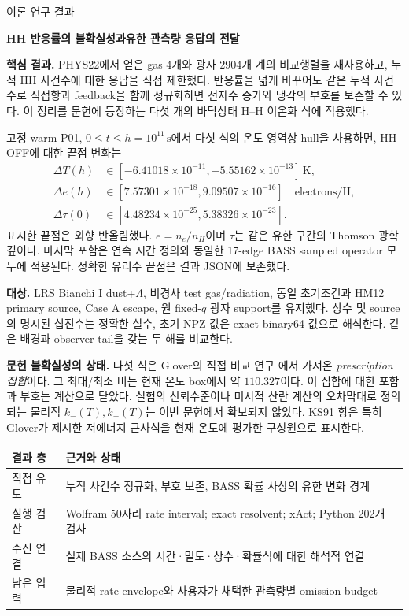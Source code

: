 \documentclass[11pt,a4paper]{article}
\begin{document}
{\large\sffamily\color{ink} 이론 연구 결과}\par
{\LARGE\bfseries HH 반응률의 불확실성과\newline 유한 관측량 응답의 전달}\par
\vspace{3mm}
\textbf{핵심 결과.} PHYS22에서 얻은 gas 4개와 광자 2904개 계의 비교행렬을 재사용하고, 누적 HH 사건수에 대한 응답을 직접 제한했다. 반응률을 넓게 바꾸어도 같은 누적 사건수로 직접항과 feedback을 함께 정규화하면 전자수 증가와 냉각의 부호를 보존할 수 있다. 이 정리를 문헌에 등장하는 다섯 개의 바닥상태 H--H 이온화 식에 적용했다.

고정 warm P01, $0\le t\le h=10^{11}\,\mathrm s$에서 다섯 식의 온도 영역상 hull을 사용하면, HH-OFF에 대한 끝점 변화는
\begin{align}
\Delta T(h)&\in[-6.41018\times10^{-11},-5.55162\times10^{-13}]\,\mathrm K,\\
\Delta e(h)&\in[7.57301\times10^{-18},9.09507\times10^{-16}]\quad\text{electrons/H},\\
\Delta\tau(0)&\in[4.48234\times10^{-25},5.38326\times10^{-23}].
\end{align}
표시한 끝점은 외향 반올림했다. $e=n_e/n_H$이며 $\tau$는 같은 유한 구간의 Thomson 광학깊이다. 마지막 포함은 연속 시간 정의와 동일한 17-edge BASS sampled operator 모두에 적용된다. 정확한 유리수 끝점은 결과 JSON에 보존했다.

\textbf{대상.} LRS Bianchi I dust+$\Lambda$, 비경사 test gas/radiation, 동일 초기조건과 HM12 primary source, Case A escape, 원 fixed-$q$ 광자 support를 유지했다. 상수 및 source의 명시된 십진수는 정확한 실수, 초기 NPZ 값은 exact binary64 값으로 해석한다. 같은 배경과 observer tail을 갖는 두 해를 비교한다.

\textbf{문헌 불확실성의 상태.} 다섯 식은 Glover의 직접 비교 연구 \cite{glover}에서 가져온 \emph{prescription 집합}이다. 그 최대/최소 비는 현재 온도 box에서 약 $110.327$이다. 이 집합에 대한 포함과 부호는 계산으로 닫았다. 실험의 신뢰수준이나 미시적 산란 계산의 오차막대로 정의되는 물리적 $k_-(T),k_+(T)$는 이번 문헌에서 확보되지 않았다. KS91 항은 특히 Glover가 제시한 저에너지 근사식을 현재 온도에 평가한 구성원으로 표시한다.

\begin{center}\begin{tabularx}{\linewidth}{@{}lX@{}}\toprule
결과 층 & 근거와 상태\\\midrule
직접 유도 & 누적 사건수 정규화, 부호 보존, BASS 확률 사상의 유한 변화 경계\\
실행 검산 & Wolfram 50자리 rate interval; exact resolvent; xAct; Python 202개 검사\\
수신 연결 & 실제 BASS 소스의 시간·밀도·상수·확률식에 대한 해석적 연결\\
남은 입력 & 물리적 rate envelope와 사용자가 채택한 관측량별 omission budget\\\bottomrule
\end{tabularx}\end{center}
\end{document}
